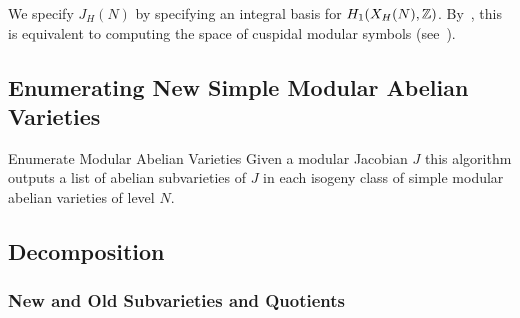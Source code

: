 \documentclass{article}
\begin{document}
We specify $J_H(N)$ by specifying an integral basis for $H_1(X_H(N), \mathbb{Z})$.
By~\cite[Theorem 1.9]{manin:parabolic}, this is equivalent to computing the
space of cuspidal modular symbols (see~\cite[\S 3]{stein:modform}).

\subsection{Enumerating New Simple Modular Abelian Varieties}

\begin{algorithm}{Enumerate Modular Abelian Varieties}
  Given a modular Jacobian $J$ this algorithm outputs a list of
  abelian subvarieties of $J$ in each isogeny class of simple modular
  abelian varieties of level $N$.
\end{algorithm}


\subsection{Decomposition}
\subsubsection{New and Old Subvarieties and Quotients}
\end{document}
